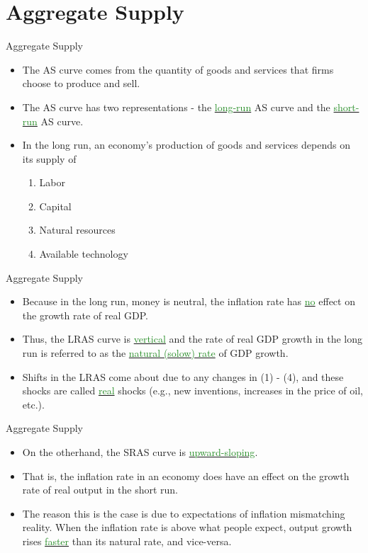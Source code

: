 \documentclass[xcolor={dvipsnames},pdf, hyperref={colorlinks=true, citecolor=ForestGreen, linkcolor=BlueViolet, urlcolor=Magenta}]{beamer}
\theoremstyle{definition}
\newcommand{\dd}[1]{{\underline{\textcolor{ForestGreen}{#1}}}}
\begin{document}
\section{Aggregate Supply}

\begin{frame}{Aggregate Supply}
	\begin{itemize}
		\item The AS curve comes from the quantity of goods and services that firms choose to produce and sell.
		\item The AS curve has two representations - the \dd{long-run} AS curve and the \dd{short-run} AS curve. 
		\item In the long run, an economy's production of goods and services depends on  its supply of
		\begin{enumerate}
			\item Labor
			\item Capital
			\item Natural resources
			\item Available technology
		\end{enumerate}
	\end{itemize}
\end{frame}

\begin{frame}{Aggregate Supply}
	\begin{itemize}
		\item Because in the long run, money is neutral, the inflation rate has \dd{no} effect on the growth rate of real GDP. 
		\item Thus, the LRAS curve is \dd{vertical} and the rate of real GDP growth in the long run is referred to as the \dd{natural (solow) rate} of GDP growth.
		\item Shifts in the LRAS come about due to any changes in (1) - (4), and these shocks are called \dd{real} shocks (e.g., new inventions, increases in the price of oil, etc.).
	\end{itemize}
\end{frame}

\begin{frame}{Aggregate Supply}
	\begin{itemize}
		\item On the otherhand, the SRAS curve is \dd{upward-sloping}. 
		\item That is, the inflation rate in an economy does have an effect on the growth rate of real output in the short run.
		\item The reason this is the case is due to expectations of inflation mismatching reality. When the inflation rate is above what people expect, output growth rises \dd{faster} than its natural rate, and vice-versa. 
	\end{itemize}
\end{frame}
\end{document}
